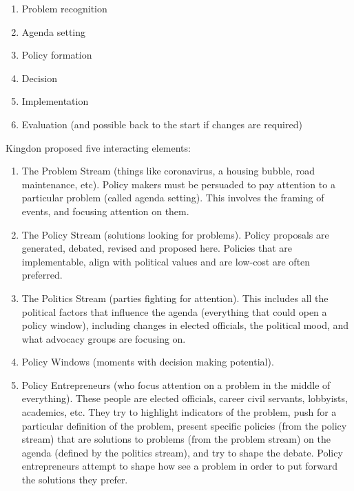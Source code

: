 
\begin{enumerate}
  \item Problem recognition
  \item Agenda setting
  \item Policy formation
  \item Decision
  \item Implementation
  \item Evaluation (and possible back to the start if changes are required)
\end{enumerate}


Kingdon proposed five interacting elements:
\begin{enumerate}
  \item The Problem Stream (things like coronavirus, a housing bubble,
    road maintenance, etc). Policy makers must be persuaded to pay
    attention to a particular problem (called agenda setting). This
    involves the framing of events, and focusing attention on them.
  \item The Policy Stream (solutions looking for problems). Policy
    proposals are generated, debated, revised and proposed
    here. Policies that are implementable, align with political values
    and are low-cost are often preferred.
  \item The Politics Stream (parties fighting for attention). This
    includes all the political factors that influence the agenda
    (everything that could open a policy window), including changes in
    elected officials, the political mood, and what advocacy groups
    are focusing on.
  \item Policy Windows (moments with decision making potential).
  \item Policy Entrepreneurs (who focus attention on a problem in the
    middle of everything). These people are elected officials, career
    civil servants, lobbyists, academics, etc. They try to highlight
    indicators of the problem, push for a particular definition of the
    problem, present specific policies (from the policy stream) that
    are solutions to problems (from the problem stream) on the agenda
    (defined by the politics stream), and try to shape the
    debate. Policy entrepreneurs attempt to shape how see a problem in
    order to put forward the solutions they prefer.
\end{enumerate}

